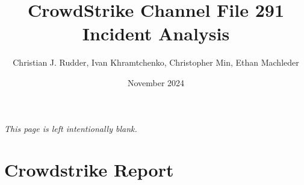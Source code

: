 \documentclass{memoir}
\title{CrowdStrike Channel File 291 Incident Analysis}
\author{Christian J. Rudder, Ivan Khramtchenko, Christopher Min, Ethan Machleder}
\date{November 2024}
\begin{document}
\maketitle
\setcounter{tocdepth}{2}

\tableofcontents

\newpage
\thispagestyle{empty}
\mbox{}
\vfill
\begin{center}
    \textit{This page is left intentionally blank.}
\end{center}
\vfill
\newpage
\thispagestyle{empty}




\chapter{Crowdstrike Report}




\end{document}

